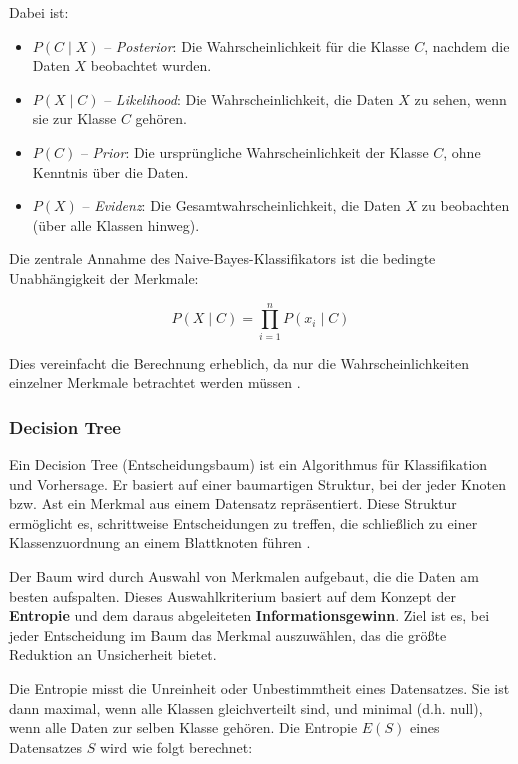 Dabei ist:

\begin{itemize}
  \item \textbf{\( P(C \mid X) \)} – \emph{Posterior}: Die Wahrscheinlichkeit für die Klasse \( C \), nachdem die Daten \( X \) beobachtet wurden.
  \item \textbf{\( P(X \mid C) \)} – \emph{Likelihood}: Die Wahrscheinlichkeit, die Daten \( X \) zu sehen, wenn sie zur Klasse \( C \) gehören.
  \item \textbf{\( P(C) \)} – \emph{Prior}: Die ursprüngliche Wahrscheinlichkeit der Klasse \( C \), ohne Kenntnis über die Daten.
  \item \textbf{\( P(X) \)} – \emph{Evidenz}: Die Gesamtwahrscheinlichkeit, die Daten \( X \) zu beobachten (über alle Klassen hinweg).
\end{itemize}

Die zentrale Annahme des Naive-Bayes-Klassifikators ist die bedingte Unabhängigkeit der Merkmale:

\begin{equation}
    P(X \mid C) = \prod_{i=1}^{n} P(x_i \mid C)
\end{equation}

Dies vereinfacht die Berechnung erheblich, da nur die Wahrscheinlichkeiten einzelner Merkmale betrachtet werden müssen \cite{webb2010naive}.

\subsubsection{Decision Tree}

Ein Decision Tree (Entscheidungsbaum) ist ein Algorithmus für Klassifikation und Vorhersage. 
Er basiert auf einer baumartigen Struktur, bei der jeder Knoten bzw. Ast ein Merkmal aus einem Datensatz repräsentiert. 
Diese Struktur ermöglicht es, schrittweise Entscheidungen zu treffen, die schließlich zu einer Klassenzuordnung an einem Blattknoten führen \cite{10.3389/frai.2023.1124553}.

Der Baum wird durch Auswahl von Merkmalen aufgebaut, die die Daten am besten aufspalten. 
Dieses Auswahlkriterium basiert auf dem Konzept der \textbf{Entropie} und dem daraus abgeleiteten \textbf{Informationsgewinn}. 
Ziel ist es, bei jeder Entscheidung im Baum das Merkmal auszuwählen, das die größte Reduktion an Unsicherheit bietet.

Die Entropie misst die Unreinheit oder Unbestimmtheit eines Datensatzes. Sie ist dann maximal, 
wenn alle Klassen gleichverteilt sind, und minimal (d.h. null), wenn alle Daten zur selben Klasse gehören. 
Die Entropie \( E(S) \) eines Datensatzes \( S \) wird wie folgt berechnet:

